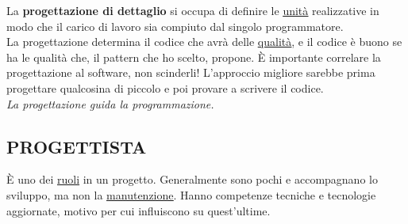 		La \textbf{progettazione di dettaglio} si occupa di definire le \underline{\hyperref[unita]{unità}} realizzative in modo che il carico di lavoro sia compiuto dal singolo programmatore.\\
		La progettazione determina il codice che avrà delle \underline{\hyperref[qualita]{qualità}}, e il codice è buono se ha le qualità che, il pattern che ho scelto, propone.
		È importante correlare la progettazione al software, non scinderli! L'approccio migliore sarebbe prima progettare qualcosina di piccolo e poi provare a scrivere il codice.\\
		\textit{La progettazione guida la programmazione.}


		\subsection{PROGETTISTA}  \label{progettista}
		È uno dei \underline{\hyperref[ruoli]{ruoli}} in un progetto. Generalmente sono pochi e accompagnano lo sviluppo, ma non la \underline{\hyperref[manutenzione]{manutenzione}}. Hanno competenze tecniche e tecnologie aggiornate, motivo per cui influiscono su quest'ultime.


